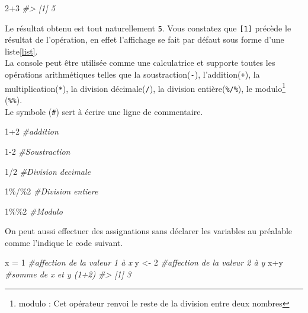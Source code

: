 \documentclass[
]{book}
\newenvironment{Shaded}{\begin{snugshade}}{\end{snugshade}}
\newcommand{\CommentTok}[1]{\textcolor[rgb]{0.56,0.35,0.01}{\textit{#1}}}
\newcommand{\DecValTok}[1]{\textcolor[rgb]{0.00,0.00,0.81}{#1}}
\newcommand{\NormalTok}[1]{#1}
\newcommand{\OtherTok}[1]{\textcolor[rgb]{0.56,0.35,0.01}{#1}}
\newcommand{\SpecialCharTok}[1]{\textcolor[rgb]{0.00,0.00,0.00}{#1}}
\begin{document}
\begin{Shaded}
\begin{Highlighting}[]
\DecValTok{2}\SpecialCharTok{+}\DecValTok{3}
\CommentTok{\#\textgreater{} [1] 5}
\end{Highlighting}
\end{Shaded}

Le résultat obtenu est tout naturellement \texttt{5}. Vous constatez que \texttt{{[}1{]}} précède le résultat de l'opération, en effet l'affichage se fait par défaut sous forme d'une liste\ref{list}.\\
La console peut être utilisée comme une calculatrice et supporte toutes les opérations arithmétiques telles que la soustraction(\texttt{-}), l'addition(\texttt{+}), la multiplication(\texttt{*}), la division décimale(\texttt{/}), la division entière(\texttt{\%/\%}), le modulo\footnote{modulo : Cet opérateur renvoi le reste de la division entre deux nombres} (\texttt{\%\%}).\\
Le symbole (\texttt{\#}) sert à écrire une ligne de commentaire.

\begin{Shaded}
\begin{Highlighting}[]
\DecValTok{1}\SpecialCharTok{+}\DecValTok{2} \CommentTok{\#addition}

\DecValTok{1{-}2} \CommentTok{\#Soustraction}

\DecValTok{1}\SpecialCharTok{/}\DecValTok{2} \CommentTok{\#Division decimale}

\DecValTok{1}\SpecialCharTok{\%/\%}\DecValTok{2} \CommentTok{\#Division entiere}

\DecValTok{1}\SpecialCharTok{\%\%}\DecValTok{2} \CommentTok{\#Modulo}
\end{Highlighting}
\end{Shaded}

On peut aussi effectuer des assignations sans déclarer les variables au préalable comme l'indique le code suivant.

\begin{Shaded}
\begin{Highlighting}[]
\NormalTok{x }\OtherTok{=} \DecValTok{1} \CommentTok{\#affection de la valeur 1 à x}
\NormalTok{y }\OtherTok{\textless{}{-}} \DecValTok{2} \CommentTok{\#affection de la valeur 2 à y}
\NormalTok{x}\SpecialCharTok{+}\NormalTok{y }\CommentTok{\#somme de x et y (1+2)}
\CommentTok{\#\textgreater{} [1] 3}
\end{Highlighting}
\end{Shaded}
\end{document}
